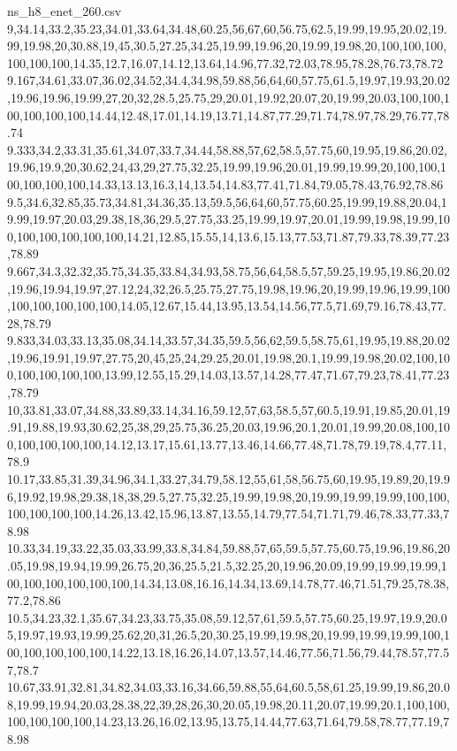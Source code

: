 \begin{filecontents*}[overwrite]{ns_h8_enet_260.csv}
9,34.14,33.2,35.23,34.01,33.64,34.48,60.25,56,67,60,56.75,62.5,19.99,19.95,20.02,19.99,19.98,20,30.88,19,45,30.5,27.25,34.25,19.99,19.96,20,19.99,19.98,20,100,100,100,100,100,100,14.35,12.7,16.07,14.12,13.64,14.96,77.32,72.03,78.95,78.28,76.73,78.72
9.167,34.61,33.07,36.02,34.52,34.4,34.98,59.88,56,64,60,57.75,61.5,19.97,19.93,20.02,19.96,19.96,19.99,27,20,32,28.5,25.75,29,20.01,19.92,20.07,20,19.99,20.03,100,100,100,100,100,100,14.44,12.48,17.01,14.19,13.71,14.87,77.29,71.74,78.97,78.29,76.77,78.74
9.333,34.2,33.31,35.61,34.07,33.7,34.44,58.88,57,62,58.5,57.75,60,19.95,19.86,20.02,19.96,19.9,20,30.62,24,43,29,27.75,32.25,19.99,19.96,20.01,19.99,19.99,20,100,100,100,100,100,100,14.33,13.13,16.3,14,13.54,14.83,77.41,71.84,79.05,78.43,76.92,78.86
9.5,34.6,32.85,35.73,34.81,34.36,35.13,59.5,56,64,60,57.75,60.25,19.99,19.88,20.04,19.99,19.97,20.03,29.38,18,36,29.5,27.75,33.25,19.99,19.97,20.01,19.99,19.98,19.99,100,100,100,100,100,100,14.21,12.85,15.55,14,13.6,15.13,77.53,71.87,79.33,78.39,77.23,78.89
9.667,34.3,32.32,35.75,34.35,33.84,34.93,58.75,56,64,58.5,57,59.25,19.95,19.86,20.02,19.96,19.94,19.97,27.12,24,32,26.5,25.75,27.75,19.98,19.96,20,19.99,19.96,19.99,100,100,100,100,100,100,14.05,12.67,15.44,13.95,13.54,14.56,77.5,71.69,79.16,78.43,77.28,78.79
9.833,34.03,33.13,35.08,34.14,33.57,34.35,59.5,56,62,59.5,58.75,61,19.95,19.88,20.02,19.96,19.91,19.97,27.75,20,45,25,24,29.25,20.01,19.98,20.1,19.99,19.98,20.02,100,100,100,100,100,100,13.99,12.55,15.29,14.03,13.57,14.28,77.47,71.67,79.23,78.41,77.23,78.79
10,33.81,33.07,34.88,33.89,33.14,34.16,59.12,57,63,58.5,57,60.5,19.91,19.85,20.01,19.91,19.88,19.93,30.62,25,38,29,25.75,36.25,20.03,19.96,20.1,20.01,19.99,20.08,100,100,100,100,100,100,14.12,13.17,15.61,13.77,13.46,14.66,77.48,71.78,79.19,78.4,77.11,78.9
10.17,33.85,31.39,34.96,34.1,33.27,34.79,58.12,55,61,58,56.75,60,19.95,19.89,20,19.96,19.92,19.98,29.38,18,38,29.5,27.75,32.25,19.99,19.98,20,19.99,19.99,19.99,100,100,100,100,100,100,14.26,13.42,15.96,13.87,13.55,14.79,77.54,71.71,79.46,78.33,77.33,78.98
10.33,34.19,33.22,35.03,33.99,33.8,34.84,59.88,57,65,59.5,57.75,60.75,19.96,19.86,20.05,19.98,19.94,19.99,26.75,20,36,25.5,21.5,32.25,20,19.96,20.09,19.99,19.99,19.99,100,100,100,100,100,100,14.34,13.08,16.16,14.34,13.69,14.78,77.46,71.51,79.25,78.38,77.2,78.86
10.5,34.23,32.1,35.67,34.23,33.75,35.08,59.12,57,61,59.5,57.75,60.25,19.97,19.9,20.05,19.97,19.93,19.99,25.62,20,31,26.5,20,30.25,19.99,19.98,20,19.99,19.99,19.99,100,100,100,100,100,100,14.22,13.18,16.26,14.07,13.57,14.46,77.56,71.56,79.44,78.57,77.57,78.7
10.67,33.91,32.81,34.82,34.03,33.16,34.66,59.88,55,64,60.5,58,61.25,19.99,19.86,20.08,19.99,19.94,20.03,28.38,22,39,28,26,30,20.05,19.98,20.11,20.07,19.99,20.1,100,100,100,100,100,100,14.23,13.26,16.02,13.95,13.75,14.44,77.63,71.64,79.58,78.77,77.19,78.98

\end{filecontents*}
